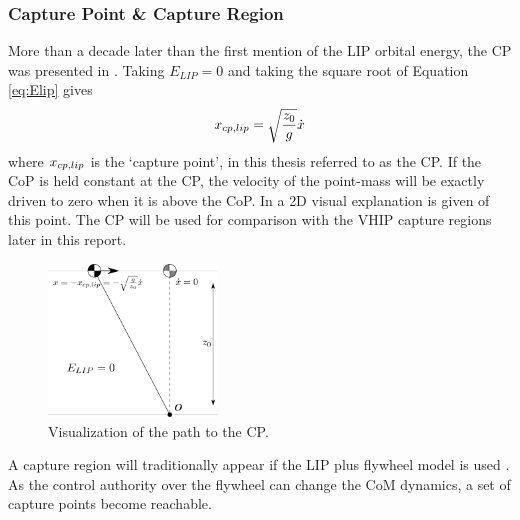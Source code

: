 \subsubsection{Capture Point \& Capture Region} 
More than a decade later than the first mention of the \ac{LIP} orbital energy, the \ac{CP} was presented in  \cite{pratt2006capture}. Taking $E_{LIP}=0$ and taking the square root of Equation \eqref{eq:Elip} gives
\begin{equation}
x_{cp,lip}=\sqrt{ \frac{z_0}{g}}\dot{x} 
\label{eq:cp}
\end{equation}
where $x_{cp,lip}$ is the `capture point', in this thesis referred to as the \ac{CP}. If the \ac{CoP} is held constant at the \ac{CP}, the velocity of the point-mass will be exactly driven to zero when it is above the \ac{CoP}. In  a \ac{2D} visual explanation is given of this point. The \ac{CP} will be used for comparison with the \ac{VHIP} capture regions later in this report.
\begin{figure}
\centering
\includegraphics[width=0.4\textwidth]{STYLESTUFF/2DCP.png}
\caption{Visualization of the path to the \ac{CP}. }
\label{fig:2dicp}
\end{figure}

A capture region will traditionally appear if the \ac{LIP} plus flywheel model is used \cite{pratt2006capture, stephens2007humanoid, koolen2012capturability}. As the control authority over the flywheel can change the \ac{CoM} dynamics, a set of capture points become reachable.

